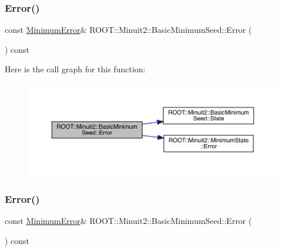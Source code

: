\subsubsection{\texorpdfstring{Error()}{Error()}\hspace{0.1cm}{\footnotesize\ttfamily [2/3]}}
{\footnotesize\ttfamily const \mbox{\hyperlink{classROOT_1_1Minuit2_1_1MinimumError}{Minimum\+Error}}\& R\+O\+O\+T\+::\+Minuit2\+::\+Basic\+Minimum\+Seed\+::\+Error (\begin{DoxyParamCaption}{ }\end{DoxyParamCaption}) const\hspace{0.3cm}{\ttfamily [inline]}}

Here is the call graph for this function\+:
\nopagebreak
\begin{figure}[H]
\begin{center}
\leavevmode
\includegraphics[width=350pt]{de/d50/classROOT_1_1Minuit2_1_1BasicMinimumSeed_a108de61cfe9f1766c3d7e251202a29df_cgraph}
\end{center}
\end{figure}
\mbox{\label{classROOT_1_1Minuit2_1_1BasicMinimumSeed_a108de61cfe9f1766c3d7e251202a29df}} 
\subsubsection{\texorpdfstring{Error()}{Error()}\hspace{0.1cm}{\footnotesize\ttfamily [3/3]}}
{\footnotesize\ttfamily const \mbox{\hyperlink{classROOT_1_1Minuit2_1_1MinimumError}{Minimum\+Error}}\& R\+O\+O\+T\+::\+Minuit2\+::\+Basic\+Minimum\+Seed\+::\+Error (\begin{DoxyParamCaption}{ }\end{DoxyParamCaption}) const\hspace{0.3cm}{\ttfamily [inline]}}

